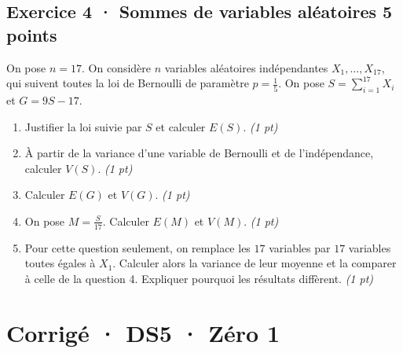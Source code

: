 \subsection*{Exercice 4 · Sommes de variables aléatoires \hfill 5 points}On pose $n=17$. On considère $n$ variables aléatoires indépendantes $X_1,\ldots,X_{17}$, qui suivent toutes la loi de Bernoulli de paramètre $p=\frac{1}{5}$. On pose $S=\displaystyle\sum_{i=1}^{17}X_i$ et $G=9S-17$.

\begin{enumerate}

\item Justifier la loi suivie par $S$ et calculer $E(S)$. \hfill\textit{(1 pt)}

\item À partir de la variance d'une variable de Bernoulli et de l'indépendance, calculer $V(S)$. \hfill\textit{(1 pt)}

\item Calculer $E(G)$ et $V(G)$. \hfill\textit{(1 pt)}

\item On pose $M=\frac S{17}$. Calculer $E(M)$ et $V(M)$. \hfill\textit{(1 pt)}

\item Pour cette question seulement, on remplace les $17$ variables par $17$ variables toutes égales à $X_1$. Calculer alors la variance de leur moyenne et la comparer à celle de la question 4. Expliquer pourquoi les résultats diffèrent. \hfill\textit{(1 pt)}

\end{enumerate}

\ifmxteacher\mxnewpage

\section*{Corrigé · DS5 · Zéro 1}\label{cor:7-1}

